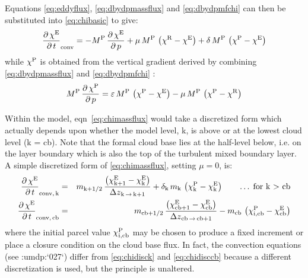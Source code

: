 \documentclass{UMDP_article}
\newcommand{\citeumdp}[1]{:umdp:`#1`}
\newcommand{\xsubsup}[2]{\ensuremath{{\chi}_{\rm{#1}}^{\rm{#2}}}}
\newcommand{\lp}{\left(}
\newcommand{\rp}{\right)}
\newcommand{\pardbyd}[2]{\ensuremath{\frac{\partial \, #1}{\partial \, #2}}}
\begin{document}
Equations \ref{eq:eddyflux}, \ref{eq:dbydpmassflux} and
\ref{eq:dbydpmfchi} can then be substituted into \ref{eq:chibasic} to give:
%
\begin{equation}
{\pardbyd{\xsubsup{ }{E}}{t}}_{\rm{conv}} = 
- M^{\rm{P}} \, \pardbyd{\xsubsup{ }{E}}{p} 
+ \mu \, M^{\rm{P}} \, \lp { \xsubsup{ }{R} - \xsubsup{ }{E} } \rp
+ \delta \, M^{\rm{P}} \, \lp { \xsubsup{ }{P} - \xsubsup{ }{E} } \rp
\label{eq:chimassflux} \end{equation}
%
while \xsubsup{}{P} is obtained from the vertical gradient derived by combining
\ref{eq:dbydpmassflux} and \ref{eq:dbydpmfchi} :
%
\begin{equation}
M^{\rm{P}} \, \pardbyd{\xsubsup{ }{P}}{p} =  
\varepsilon \, M^{\rm{P}} \, \lp { \xsubsup{ }{P} - \xsubsup{ }{E} } \rp - 
\mu         \, M^{\rm{P}} \, \lp { \xsubsup{ }{P} - \xsubsup{ }{R} } \rp 
\label{eq:gradchipar} \end{equation}

Within the model, eqn~\ref{eq:chimassflux} would take a discretized form
which actually depends upon whether the model level, k, is above or at the
lowest cloud level (k = cb). Note that the formal cloud base lies at the
half-level below, i.e. on the layer boundary which is also the top of the
turbulent mixed boundary layer. A simple discretized form of
\ref{eq:chimassflux}, setting ${ \mu = 0 }$, is:
%
\begin{eqnarray}
{\pardbyd{\xsubsup{ }{E}}{t}}_{\rm{conv, \, k}} & = & m_{\rm{k+1/2}} \, 
\frac{ \lp {\xsubsup{k+1}{E} - \xsubsup{k}{E}} \rp }
{{\Delta z}_{\rm{k \, \rightarrow \, k+1}}} 
+ {\delta}_{\rm{k}} \, m_{\rm{k}} \, \lp { \xsubsup{k}{P} - \xsubsup{k}{E} } \rp  
\qquad \ldots \; \mbox{for k $>$ cb} \label{eq:chidisck} \\
{\pardbyd{\xsubsup{ }{E}}{t}}_{\rm{conv, \, cb}} & = & m_{\rm{cb+1/2}} \, 
\frac{ \lp {\xsubsup{cb+1}{E} - \xsubsup{cb}{E}} \rp }
{{\Delta z}_{\rm{cb \, \rightarrow \, cb+1}}} 
- m_{\rm{cb}} \, 
\lp { \xsubsup{i,cb}{P} - \xsubsup{cb}{E} } \rp  \label{eq:chidisccb}
\end{eqnarray}
%
where the initial parcel value \xsubsup{i,cb}{P} may be chosen to produce a
fixed increment or place a closure condition on the cloud base flux. In fact,
the convection equations (see \citeumdp{027}) differ from \ref{eq:chidisck} and
\ref{eq:chidisccb} because a different discretization is used, but the
principle is unaltered.  
\end{document}
